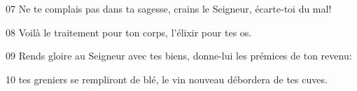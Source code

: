 
07 Ne te complais pas dans ta sagesse, crains le Seigneur, écarte-toi du mal!

08 Voilà le traitement pour ton corps, l’élixir pour tes os.

09 Rends gloire au Seigneur avec tes biens, donne-lui les prémices de ton revenu:

10 tes greniers se rempliront de blé, le vin nouveau débordera de tes cuves.
